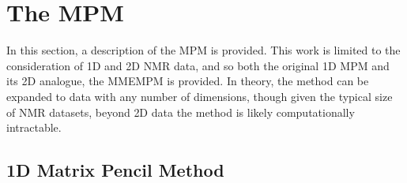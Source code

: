 \section{The \acl{MPM}}
\label{sec:mpm}
In this section, a description of the \ac{MPM} is provided. This work is
limited to the consideration of \ac{1D} and \ac{2D} \ac{NMR} data, and so both
the original \ac{1D} \ac{MPM} and its \ac{2D} analogue, the \ac{MMEMPM} is
provided. In theory, the method can be expanded to data with any number of
dimensions\cite{Yilmazer2006}, though given the typical size of \ac{NMR}
datasets, beyond \ac{2D} data the method is likely computationally intractable.

\subsection{1D Matrix Pencil Method}
\label{subsec:mpm}

